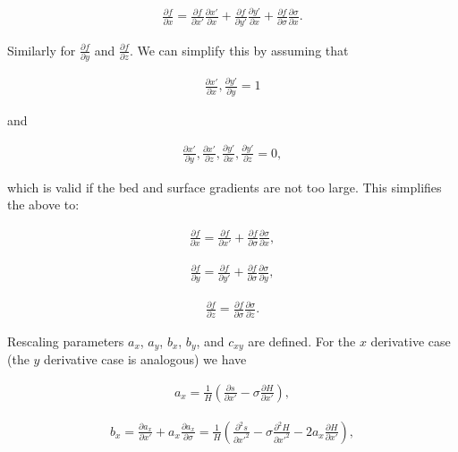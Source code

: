 \begin{align*}
\frac{\partial f}{\partial x} = \frac{\partial f}{\partial x'} \frac{\partial x'}{\partial x} + \frac{\partial f}{\partial y'} \frac{\partial y'}{\partial x} + \frac{\partial f}{\partial \sigma} \frac{\partial \sigma}{\partial x}.
\end{align*}

Similarly for $\frac{\partial f}{\partial y}$ and $\frac{\partial f}{\partial z}$. We can simplify this by assuming that 

\begin{align*}
\frac{\partial x'}{\partial x}, \frac{\partial y'}{\partial y} = 1
\end{align*}

and

\begin{align*}
\frac{\partial x'}{\partial y}, \frac{\partial x'}{\partial z}, \frac{\partial y'}{\partial x}, \frac{\partial y'}{\partial z} = 0,
\end{align*}

which is valid if the bed and surface gradients are not too large. This simplifies the above to:

\begin{align*}
\frac{\partial f}{\partial x} = \frac{\partial f}{\partial x'} + \frac{\partial f}{\partial \sigma}\frac{\partial \sigma}{\partial x},
\end{align*}

\begin{align*}
\frac{\partial f}{\partial y} = \frac{\partial f}{\partial y'} + \frac{\partial f}{\partial \sigma}\frac{\partial \sigma}{\partial y},
\end{align*}

\begin{align*}
\frac{\partial f}{\partial z} = \frac{\partial f}{\partial \sigma}\frac{\partial \sigma}{\partial z}.
\end{align*}

Rescaling parameters $a_{x}$, $a_{y}$, $b_{x}$, $b_{y}$, and $c_{xy}$ are defined. For the $x$ derivative case (the $y$ derivative case is analogous) we have

\begin{align*}
a_{x} = \frac{1}{H}(\frac{\partial s}{\partial x'} - \sigma \frac{\partial H}{\partial x'}),
\end{align*}

\begin{align*}
b_{x} = \frac{\partial a_x}{\partial x'} + a_x \frac{\partial a_x}{\partial \sigma} 
    = \frac{1}{H} (\frac{\partial^2 s}{\partial x'^2} - \sigma \frac{\partial^2 H}{\partial x'^2} - 2a_x \frac{\partial H}{\partial x'}),
\end{align*}

